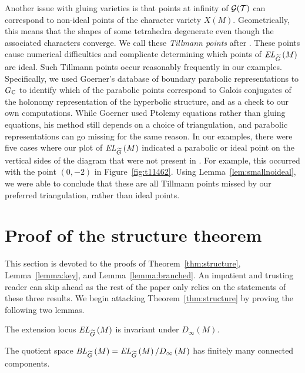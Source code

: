 \documentclass[tikz, sepfignums, defaultenums]{nmd/article}
\newcommand{\GC}{G_\C}
\newcommand{\TEL}[1]{\mathit{EL}_\Gtil\left(#1\right)}
\newcommand{\SymTEL}[1]{D_\infty\left(#1\right)}
\newcommand{\TELquo}[1]{\mathit{BL}_\Gtil\left(#1\right)}
\begin{document}
Another issue with gluing varieties is that points at infinity of
${\mathcal G}({\mathcal T})$ can correspond to non-ideal points of the character variety
$X(M)$.  Geometrically, this means that the shapes of some tetrahedra
degenerate even though the associated characters converge.  We
call these \emph{Tillmann points} after \cite{Tillmann2012}.  These
points cause numerical difficulties and complicate determining which
points of $\TEL{M}$ are ideal. Such Tillmann points occur reasonably
frequently in our examples.  Specifically, we used Goerner's
database \cite{GoernerDatabase} of boundary parabolic
representations to $\GC$ to identify which of the parabolic points
correspond to Galois conjugates of the holonomy representation of the
hyperbolic structure, and as a check to our own computations.  While
Goerner used Ptolemy equations rather than gluing equations, his
method still depends on a choice of triangulation, and parabolic
representations can go missing for the same reason.  In our examples,
there were five cases where our plot of $\TEL{M}$ indicated a
parabolic or ideal point on the vertical sides of the diagram that
were not present in \cite{GoernerDatabase}. For example, this occurred
with the point $(0, -2)$ in Figure~\ref{fig:t11462}.  Using
Lemma~\ref{lem:smallnoideal}, we were able to conclude that these are
all Tillmann points missed by our preferred triangulation, rather than
ideal points.


\section{Proof of the structure theorem}
\label{sec:structureproofs}

This section is devoted to the proofs of Theorem~\ref{thm:structure},
Lemma~\ref{lemma:key}, and Lemma~\ref{lemma:branched}.  An impatient
and trusting reader can skip ahead as the rest of the paper only
relies on the statements of these three results.  We begin attacking
Theorem~\ref{thm:structure} by proving the following two lemmas.

\begin{lemma}\label{lem:telsym}
  The extension locus $\TEL{M}$ is invariant under $\SymTEL{M}$.
\end{lemma}

\begin{lemma}\label{lem:finitecomp}
  The quotient space $\TELquo{M} = \TEL{M}/\SymTEL{M}$ has finitely
  many connected components.
\end{lemma}
\end{document}
